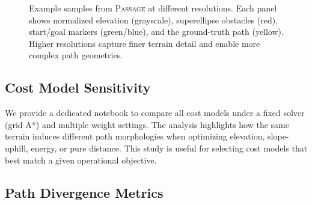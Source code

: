 \documentclass{article}
\newcommand{\dataset}{\textsc{Passage}}
\begin{document}
\begin{figure}[t]
\centering
\caption{Example samples from \dataset{} at different resolutions. Each panel shows normalized elevation (grayscale), superellipse obstacles (red), start/goal markers (green/blue), and the ground-truth path (yellow). Higher resolutions capture finer terrain detail and enable more complex path geometries.}
\label{fig:samples}
\end{figure}

\subsection{Cost Model Sensitivity}

We provide a dedicated notebook to compare all cost models under a fixed solver (grid A*) and multiple weight settings. The analysis highlights how the same terrain induces different path morphologies when optimizing elevation, slope-uphill, energy, or pure distance. This study is useful for selecting cost models that best match a given operational objective.

\subsection{Path Divergence Metrics}
\end{document}
